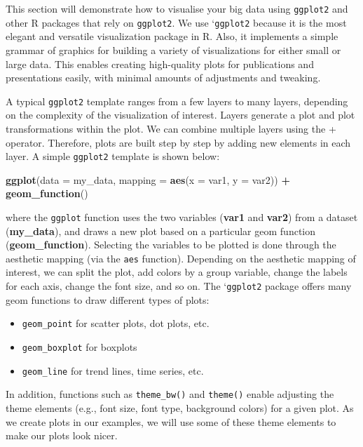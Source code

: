 \documentclass[]{book}
\newenvironment{Shaded}{\begin{snugshade}}{\end{snugshade}}
\newcommand{\DataTypeTok}[1]{\textcolor[rgb]{0.13,0.29,0.53}{#1}}
\newcommand{\KeywordTok}[1]{\textcolor[rgb]{0.13,0.29,0.53}{\textbf{#1}}}
\newcommand{\NormalTok}[1]{#1}
\newcommand{\OperatorTok}[1]{\textcolor[rgb]{0.81,0.36,0.00}{\textbf{#1}}}
\newcommand{\StringTok}[1]{\textcolor[rgb]{0.31,0.60,0.02}{#1}}
\providecommand{\tightlist}{%
  \setlength{\itemsep}{0pt}\setlength{\parskip}{0pt}}
\begin{document}
This section will demonstrate how to visualise your big data using \texttt{ggplot2} and other R packages that rely on \texttt{ggplot2}. We use `\texttt{ggplot2} because it is the most elegant and versatile visualization package in R. Also, it implements a simple grammar of graphics for building a variety of visualizations for either small or large data. This enables creating high-quality plots for publications and presentations easily, with minimal amounts of adjustments and tweaking.

A typical \texttt{ggplot2} template ranges from a few layers to many layers, depending on the complexity of the visualization of interest. Layers generate a plot and plot transformations within the plot. We can combine multiple layers using the + operator. Therefore, plots are built step by step by adding new elements in each layer. A simple \texttt{ggplot2} template is shown below:

\begin{Shaded}
\begin{Highlighting}[]
\KeywordTok{ggplot}\NormalTok{(}\DataTypeTok{data =}\NormalTok{ my_data,}
       \DataTypeTok{mapping =} \KeywordTok{aes}\NormalTok{(}\DataTypeTok{x =}\NormalTok{ var1, }\DataTypeTok{y =}\NormalTok{ var2)) }\OperatorTok{+}
\StringTok{  }\KeywordTok{geom_function}\NormalTok{()}
\end{Highlighting}
\end{Shaded}

where the \texttt{ggplot} function uses the two variables (\textbf{var1} and \textbf{var2}) from a dataset (\textbf{my\_data}), and draws a new plot based on a particular geom function (\textbf{geom\_function}). Selecting the variables to be plotted is done through the aesthetic mapping (via the \texttt{aes} function). Depending on the aesthetic mapping of interest, we can split the plot, add colors by a group variable, change the labels for each axis, change the font size, and so on. The `\texttt{ggplot2} package offers many geom functions to draw different types of plots:

\begin{itemize}
\tightlist
\item
  \texttt{geom\_point} for scatter plots, dot plots, etc.
\item
  \texttt{geom\_boxplot} for boxplots
\item
  \texttt{geom\_line} for trend lines, time series, etc.
\end{itemize}

In addition, functions such as \texttt{theme\_bw()} and \texttt{theme()} enable adjusting the theme elements (e.g., font size, font type, background colors) for a given plot. As we create plots in our examples, we will use some of these theme elements to make our plots look nicer.
\end{document}
